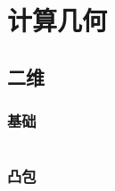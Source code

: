 \chapter{计算几何}
\section{二维}
\subsection{基础}
\inputminted{cpp}{\source/computational-geometry/2d/basis.cpp}
\subsection{凸包}
\inputminted{cpp}{\source/computational-geometry/2d/convex.cpp}